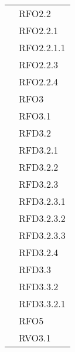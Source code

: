 \begin{longtable}{|>{\centering}m{10cm}|m{3cm}<{\centering}|}
& RFO2.2\\
& RFO2.2.1\\
& RFO2.2.1.1\\
& RFO2.2.3\\
& RFO2.2.4\\
& RFO3\\
& RFO3.1\\
& RFD3.2\\
& RFD3.2.1\\
& RFD3.2.2\\
& RFD3.2.3\\
& RFD3.2.3.1\\
& RFD3.2.3.2\\
& RFD3.2.3.3\\
& RFD3.2.4\\
& RFD3.3\\
& RFD3.3.2\\
& RFD3.3.2.1\\
& RFO5\\
& RVO3.1\\ \hline


\end{longtable}
